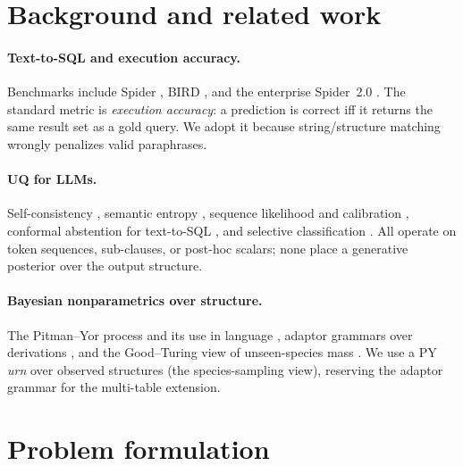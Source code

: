 \documentclass[11pt]{article}
\begin{document}
\section{Background and related work}

\paragraph{Text-to-SQL and execution accuracy.} Benchmarks include Spider \citep{yu2018spider},
BIRD \citep{li2023bird}, and the enterprise Spider~2.0 \citep{lei2025spider2}. The standard metric
is \emph{execution accuracy}: a prediction is correct iff it returns the same result set as a gold
query. We adopt it because string/structure matching wrongly penalizes valid paraphrases.

\paragraph{UQ for LLMs.} Self-consistency \citep{wang2023selfconsistency}, semantic entropy
\citep{kuhn2023semantic,farquhar2024semantic}, sequence likelihood and calibration
\citep{guo2017calibration,ramachandran2024calibrating}, conformal abstention for text-to-SQL
\citep{somov2025rts}, and selective classification \citep{geifman2017selective}. All operate on
token sequences, sub-clauses, or post-hoc scalars; none place a generative posterior over the output
structure.

\paragraph{Bayesian nonparametrics over structure.} The Pitman--Yor process \citep{pitman1997two}
and its use in language \citep{teh2006pyp}, adaptor grammars over derivations
\citep{johnson2007adaptor}, and the Good--Turing view of unseen-species mass \citep{good1953population}.
We use a PY \emph{urn} over observed structures (the species-sampling view), reserving the adaptor
grammar for the multi-table extension.

\section{Problem formulation}\label{sec:setup}
\end{document}
